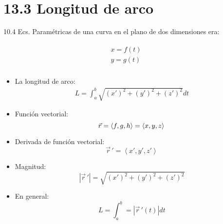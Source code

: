 \section{13.3 Longitud de arco}
10.4 Ecs. Paramétricas de una curva en el plano de dos dimensiones era:
\begin{center}
   \begin{align*}
       \begin{matrix}
        x=f(t) \\ 
        y = g(t) \\ 
       \end{matrix}
   \end{align*}
\end{center}
\begin{itemize}
    \item La longitud de arco:
        \begin{align*}
            L = \int_{a}^{b} \sqrt{(x')^2+(y')^2+(z')^2} dt
        \end{align*}
    
    \item Función vectorial:
        \[
          \vec{r} = \left\langle f,g,h \right\rangle = \left\langle x,y,z \right\rangle \\ 
        \]
    
    
    \item Derivada de función vectorial:
        \[
          \vec{r}\,'= \left\langle x',y',z' \right\rangle 
        \]
    
    \item Magnitud: 
        \[
          \left| \vec{r}\,' \right| = \sqrt{(x')^2+(y')^2+(z')^2}
        \]
    
    \item En general: 
        \[
          L = \int_{a}^{b} = \left| \vec{r}\,'(t) \right|dt  
        \]
\end{itemize}



